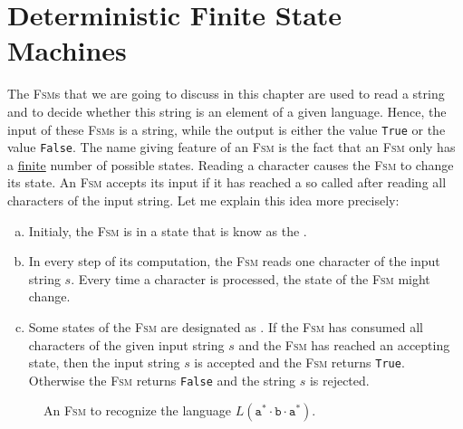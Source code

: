 \section{Deterministic Finite State Machines}
The \textsc{Fsm}s that we are going to discuss in this chapter are used to read a string and
to decide whether this string is an element of a given language.  Hence, the input of these 
\textsc{Fsm}s is a string, while the output is either the value \texttt{True} or the value \texttt{False}.
The name giving feature of an \textsc{Fsm} is the fact that an \textsc{Fsm} only has a
\underline{finite} number of possible states.  Reading a character causes the \textsc{Fsm} to change its state.
An \textsc{Fsm} accepts its input if it has reached a so called  after reading
all characters of the input string.  Let me explain this idea more precisely:
\begin{enumerate}[(a)]
\item Initialy, the \textsc{Fsm} is in a state that is know as the . 
\item In every step of its computation, the \textsc{Fsm} reads one character of the input string
      $s$.  Every time a character is processed, the state of the \textsc{Fsm} might change.
\item Some states of the \textsc{Fsm} are designated as .  
      If the \textsc{Fsm} has consumed all characters of the given input string $s$ and the \textsc{Fsm}
      has reached an accepting state, then the input string $s$ is accepted and the \textsc{Fsm}
      returns \texttt{True}.  Otherwise the \textsc{Fsm} returns \texttt{False} and the string $s$
      is rejected.
\end{enumerate}
\begin{figure}[!ht]
  \centering
   \caption{An \textsc{Fsm} to recognize the language $L(\texttt{a}^*\cdot\texttt{b}\cdot\texttt{a}^*)$.}
  \label{fig:abstara.dot}
\end{figure}


